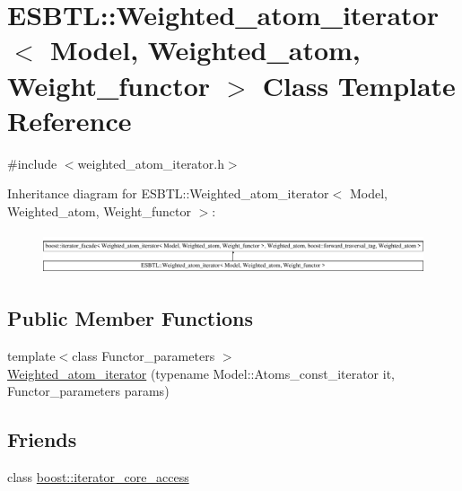 \hypertarget{classESBTL_1_1Weighted__atom__iterator}{}\section{E\+S\+B\+TL\+:\+:Weighted\+\_\+atom\+\_\+iterator$<$ Model, Weighted\+\_\+atom, Weight\+\_\+functor $>$ Class Template Reference}
\label{classESBTL_1_1Weighted__atom__iterator}


{\ttfamily \#include $<$weighted\+\_\+atom\+\_\+iterator.\+h$>$}

Inheritance diagram for E\+S\+B\+TL\+:\+:Weighted\+\_\+atom\+\_\+iterator$<$ Model, Weighted\+\_\+atom, Weight\+\_\+functor $>$\+:\begin{figure}[H]
\begin{center}
\leavevmode
\includegraphics[height=1.240310cm]{classESBTL_1_1Weighted__atom__iterator}
\end{center}
\end{figure}
\subsection*{Public Member Functions}
\begin{DoxyCompactItemize}
\item 
{\footnotesize template$<$class Functor\+\_\+parameters $>$ }\\\hyperlink{classESBTL_1_1Weighted__atom__iterator_a41781a4ac59637e0d6577fe7b929fb99}{Weighted\+\_\+atom\+\_\+iterator} (typename Model\+::\+Atoms\+\_\+const\+\_\+iterator it, Functor\+\_\+parameters params)
\end{DoxyCompactItemize}
\subsection*{Friends}
\begin{DoxyCompactItemize}
\item 
class \hyperlink{classESBTL_1_1Weighted__atom__iterator_ac09f73e325921cc50ebcd96bed0f8096}{boost\+::iterator\+\_\+core\+\_\+access}
\end{DoxyCompactItemize}



